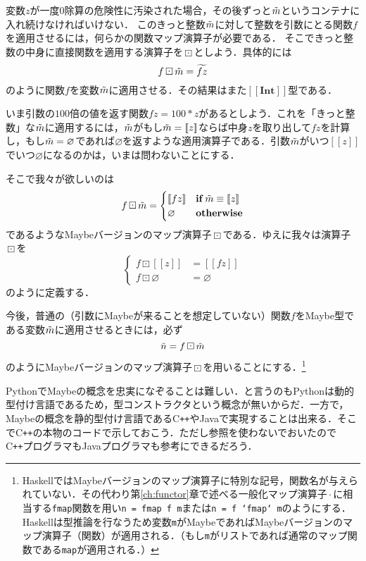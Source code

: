 \documentclass[twocolumn]{jsbook}
\def\[{[\![}
\def\]{]\!]}
\newcommand{\cxx}{\textrm{C}\texttt{++}}
\newcommand{\code}[1]{\texttt{#1}}
\newcommand{\hsklType}[1]{\textbf{#1}}
\DeclareMathOperator{\hsklFmap}{\cdot}
\DeclareMathOperator{\hsklMaybeMap}{\boxdot}
\newcommand{\hsklInt}{\hsklType{Int}}
\newcommand{\hsklNothing}{\varnothing}
\newcommand{\hsklJust}[1]{\[#1\]}
\newcommand{\hsklMaybe}[1]{\Tilde{#1}}
\newcommand{\hsklMaybeW}[1]{\widetilde{#1}}
\newcommand{\hsklMaybeType}[1]{\[#1\]}
\newcommand{\mathKeyword}[1]{\mathbf{#1}}
\DeclareMathOperator{\mathIf}{\mathKeyword{if}}
\newcommand{\mathOtherwise}{\mathKeyword{otherwise}}
\begin{document}
変数$z$が一度$0$除算の危険性に汚染された場合，その後ずっと$\hsklMaybe{m}$というコンテナに入れ続けなければいけない．
このきっと整数$\hsklMaybe{m}$に対して整数を引数にとる関数$f$を適用させるには，何らかの関数マップ演算子が必要である．
そこできっと整数の中身に直接関数を適用する演算子を$\hsklMaybeMap$としよう．具体的には$$f\hsklMaybeMap\hsklMaybe{m}=\hsklMaybeW{fz}$$のように関数$f$を変数$\hsklMaybe{m}$に適用させる．その結果はまた$\hsklMaybeType{\hsklInt}$型である．

いま引数の$100$倍の値を返す関数$fz=100*z$があるとしよう．これを「きっと整数」な$\hsklMaybe{m}$に適用するには，$\hsklMaybe{m}$がもし$\hsklMaybe{m}=\hsklJust{z}$ならば中身$z$を取り出して$fz$を計算し，もし$\hsklMaybe{m}=\hsklNothing$であれば$\hsklNothing$を返すような適用演算子である．引数$\hsklMaybe{m}$がいつ$\hsklJust{z}$でいつ$\hsklNothing$になるのかは，いまは問わないことにする．

そこで我々が欲しいのは
\begin{equation*}
f\hsklMaybeMap\hsklMaybe{m}=\begin{cases}
\hsklJust{fz}&\mathIf\hsklMaybe{m}\equiv\hsklJust{z}\\
\hsklNothing&\mathOtherwise
\end{cases}
\end{equation*}
であるようなMaybeバージョンのマップ演算子$\hsklMaybeMap$である．ゆえに我々は演算子$\hsklMaybeMap$を
\begin{equation*}
\left\{
\begin{split}
f\hsklMaybeMap\hsklJust{z}&=\hsklJust{fz}\\
f\hsklMaybeMap\hsklNothing&=\hsklNothing
\end{split}
\right.
\end{equation*}
のように定義する．

今後，普通の（引数にMaybeが来ることを想定していない）関数$f$をMaybe型である変数$\hsklMaybe{m}$に適用させるときには，必ず$$\hsklMaybe{n}=f\hsklMaybeMap\hsklMaybe{m}$$のようにMaybeバージョンのマップ演算子$\hsklMaybeMap$を用いることにする．\footnote{HaskellではMaybeバージョンのマップ演算子に特別な記号，関数名が与えられていない．その代わり第\ref{ch:functor}章で述べる一般化マップ演算子$\hsklFmap$に相当する\code{fmap}関数を用い\code{n = fmap f m}または\code{n = f `fmap` m}のようにする．Haskellは型推論を行なうため変数\code{m}がMaybeであればMaybeバージョンのマップ演算子（関数）が適用される．（もし\code{m}がリストであれば通常のマップ関数である\code{map}が適用される．）}

PythonでMaybeの概念を忠実になぞることは難しい．と言うのもPythonは動的型付け言語であるため，型コンストラクタという概念が無いからだ．一方で，Maybeの概念を静的型付け言語である\cxx やJavaで実現することは出来る．そこで\cxx の本物のコードで示しておこう．ただし参照を使わないでおいたので\cxx プログラマもJavaプログラマも参考にできるだろう．
\end{document}
